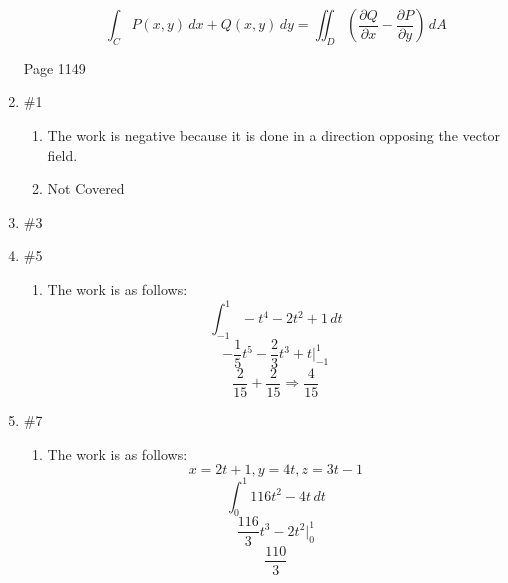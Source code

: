 \documentclass[12pt]{article}
\begin{document}
\begin{enumerate}
\begin{enumerate}
        $$\int_C P(x,y)\,dx+Q(x,y)\,dy=\iint_D\left(\frac{\partial Q}{\partial x}-\frac{\partial P}{\partial y}\right)\,dA$$
\newpage
    \end{enumerate}

\begin{center}

Page 1149

\end{center}

    \item \#1 \begin{enumerate}

        \item The work is negative because it is done in a direction opposing the vector field.

        \item Not Covered

\end{enumerate}

    \item \#3 \begin{enumerate}

        \item The work is as follows:
          $$\int_0^{\pi} 9\cos^2(t)\sin(t)\sqrt{10}\,dt$$
          $$u=\cos(t)\Longrightarrow du=-\sin(t)dt$$
          $$-\int_1^{-1}9u^2\sqrt{10} $$
          $$-\sqrt{10}\left(3u^3\Big|_1^{-1}\right)\Longrightarrow -\sqrt{10}(-6)$$
          $$6\sqrt{10$$

    \end{enumerate}

  \item \#5 \begin{enumerate}

			\item The work is as follows:
              $$\int_{-1}^1 -t^4-2t^2+1\,dt$$
              $$-\frac{1}{5}t^5-\frac{2}{3}t^3+t\Big|_{-1}^1$$
              $$\frac{2}{15}+\frac{2}{15}\Longrightarrow\frac{4}{15}$$

        \end{enumerate}

    \item \#7 \begin{enumerate}

				\item The work is as follows:
                  $$x=2t+1,y=4t,z=3t-1$$
                  $$\int_0^1 116t^2-4t\,dt$$
                  $$\frac{116}{3}t^3-2t^2\Big|_0^1$$
                  $$\frac{110}{3}$$



\end{enumerate}
\end{enumerate}
\end{document}
